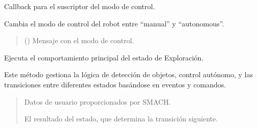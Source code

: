 \documentclass[a4paper,10pt,spanish]{sphinxmanual}
\begin{document}
\begin{fulllineitems}
\begin{fulllineitems}
\label{\detokenize{squad_state_manager:squad_state_manager.EstadoExploracion.control_mode_callback}}
\pysigstartsignatures
{}
\pysigstopsignatures
\sphinxAtStartPar
Callback para el suscriptor del modo de control.

\sphinxAtStartPar
Cambia el modo de control del robot entre “manual” y “autonomous”.
\begin{quote}\begin{description}
\sphinxAtStartPar
{} () \textendash{} Mensaje con el modo de control.

\end{description}\end{quote}

\end{fulllineitems}


\begin{fulllineitems}
\label{\detokenize{squad_state_manager:squad_state_manager.EstadoExploracion.execute}}
\pysigstartsignatures
{}
\pysigstopsignatures
\sphinxAtStartPar
Ejecuta el comportamiento principal del estado de Exploración.

\sphinxAtStartPar
Este método gestiona la lógica de detección de objetos, control autónomo,
y las transiciones entre diferentes estados basándose en eventos y comandos.
\begin{quote}\begin{description}
\sphinxAtStartPar
{} \textendash{} Datos de usuario proporcionados por SMACH.

\sphinxAtStartPar
El resultado del estado, que determina la transición siguiente.

\sphinxAtStartPar
{}

\end{description}\end{quote}


\end{fulllineitems}
\end{fulllineitems}
\end{document}
